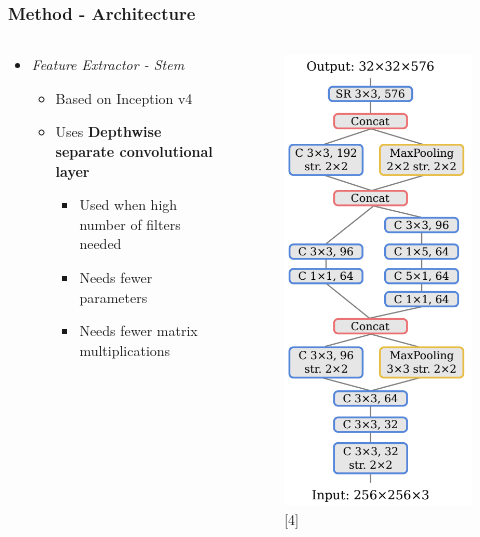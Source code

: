 \documentclass[9pt]{beamer}
\providecommand{\sourcefix}[1]{\\ \footnotesize \tugreen{Source:} [#1]}
\newenvironment{myframe}[1][]{%
\begin{frame}%
\frametitle{#1}
\setcounter{footnote}{0}


}{%
\end{frame}%
}
\begin{document}
\begin{myframe}[Method - Architecture]
    \begin{columns}[T]
        \begin{column}{.45\textwidth}
            \begin{itemize}
                \item \textit{Feature Extractor - Stem}
                \begin{itemize}
                    \item Based on Inception v4 \footnotemark
                    \item Uses \textbf{Depthwise separate convolutional layer}\footnotemark\footnotemark
                    \begin{itemize}
                        \item Used when high number of filters needed
                        \item Needs fewer parameters
                        \item Needs fewer matrix multiplications
                    \end{itemize}
                \end{itemize}
            \end{itemize}
        \end{column}
        \begin{column}{.45\textwidth}
            \begin{figure}
                \includegraphics[width=.45\textwidth]{luvizon_stem.png}
                \sourcefix{4}
            \end{figure}
        \end{column}
	\end{columns}
\end{myframe}
\end{document}

